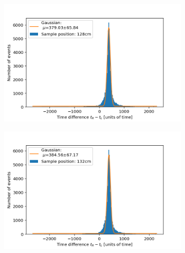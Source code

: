 \documentclass[]{article}
\begin{document}
\begin{figure}[H]
\medskip
\begin{subfigure}{0.48\textwidth}
\includegraphics[width=\linewidth]{Plots/Pos/128cm.png}
\end{subfigure}
\begin{subfigure}[c]{0.48\linewidth}
\includegraphics[width=\linewidth]{Plots/Pos/132cm.png}
\end{subfigure}


\end{figure}
\end{document}
